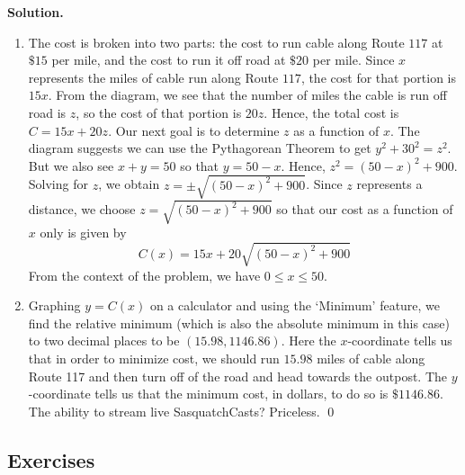 \documentclass[12pt]{ximera}
\begin{document}
\begin{example}
\begin{enumerate}
\end{enumerate}

{\bf Solution.}

\begin{enumerate}

\item  The cost is broken into two parts:  the cost to run cable along Route $117$ at $\$15$ per mile, and the cost to run it off road at $\$20$ per mile.  Since $x$ represents the miles of cable run along Route $117$, the cost  for that portion is $15x$.  From the diagram, we see that the number of miles the cable is run off road is $z$, so the cost of that portion is $20z$.  Hence, the total cost is $C = 15x + 20z$.  Our next goal is to determine $z$ as a function of $x$.  The diagram suggests we can use the Pythagorean Theorem to get $y^2+30^2 = z^2$.  But we also see $x+y = 50$ so that $y=50-x$.  Hence, $z^2 = (50-x)^2+900$.  Solving for $z$, we obtain $z = \pm \sqrt{(50-x)^2+900}$.  Since $z$ represents a distance, we choose $z = \sqrt{(50-x)^2+900}$ so that our cost as a function of $x$ only is given by \[C(x) = 15x + 20\sqrt{(50-x)^2+900}\] From the context of the problem, we have $0 \leq x \leq 50$.

\item  Graphing $y=C(x)$ on a calculator and using the `Minimum' feature, we find the relative minimum (which is also the absolute minimum in this case) to two decimal places to be $(15.98, 1146.86)$.  Here the $x$-coordinate tells us that in order to minimize cost, we should run $15.98$ miles of cable along Route 117 and then turn off of the road and head towards the outpost. The $y$-coordinate tells us that the minimum cost, in dollars, to do so is $\$1146.86$.  The ability to stream live SasquatchCasts?  Priceless. \qed

\end{enumerate}

\end{example}




\subsection{Exercises}
\end{document}
